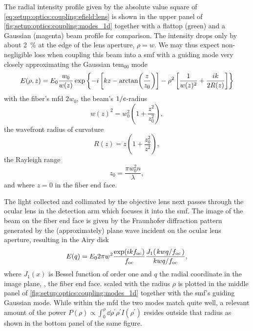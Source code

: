 The radial intensity profile given by the absolute value square of \cref{eq:setup:optics:coupling:efield:lens} is shown in the upper panel of \cref{fig:setup:optics:coupling:modes_1d} together with a flattop (green) and a Gaussian (magenta) beam profile for comparison.
The intensity drops only by about \qty{2}{\percent} at the edge of the lens aperture, $\rho=w$.
We may thus expect non-negligible loss when coupling this beam into a \gls{smf} with a guiding mode very closely approximating the Gaussian \acrshort{tem}$_{00}$ mode~\cite{Yariv1989,Kowalevicz2006}
\begin{equation}\label{eq:setup:optics:coupling:efield:tem00}
    E(\rho, z) = E_0\frac{w_0}{w(z)}\exp\left\lbrace -i\left[kz - \arctan(\frac{z}{z_0})\right] - \rho^2\left[\frac{1}{w(z)^2} + \frac{ik}{2 R(z)}\right]\right\rbrace
\end{equation}
with the fiber's \gls{mfd} $2 w_0$, the beam's $1/e$-radius
\begin{equation}
    w(z)^2 = w_0^2\left(1 + \frac{z^2}{z_0^2}\right),
\end{equation}
the wavefront radius of curvature
\begin{equation}
    R(z) = z\left(1 + \frac{z_0^2}{z^2}\right),
\end{equation}
the Rayleigh range
\begin{equation}
    z_0 = \frac{\pi w_0^2 n}{\lambda},
\end{equation}
and where $z=0$ in the fiber end face.

The light collected and collimated by the objective lens next passes through the ocular lens in the detection arm which focuses it into the \gls{smf}.
The image of the beam on the fiber end face is given by the Fraunhofer diffraction pattern generated by the (approximately) plane wave incident on the ocular lens aperture,
resulting in the Airy disk~\cite{Hecht2017}
\begin{equation}\label{eq:setup:optics:coupling:airy}
    E(q) = E_0 2\pi w^2\frac{\exp(\i k \foc)}{\foc} \frac{J_1(\flatfrac{kwq}{\foc})}{\flatfrac{kwq}{\foc}},
\end{equation}
where $J_1(x)$ is Bessel function of order one and $q$ the radial coordinate in the image plane, \ie, the fiber end face.
 scaled with the radius $\rho$ is plotted in the middle panel of \cref{fig:setup:optics:coupling:modes_1d} together with the \gls{smf}'s guiding Gaussian mode.
While within the \gls{mfd} the two modes match quite well, a relevant amount of the power $P(\rho)\propto \int_0^{\rho}\dd{\rho^{\prime}} \rho^{\prime} I(\rho^{\prime})$ resides outside that radius as shown in the bottom panel of the same figure.

